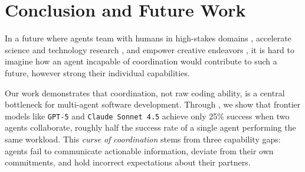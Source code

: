 



\section{Conclusion and Future Work}

In a future where agents team with humans in high-stakes domains \citep{kim2025srt}, accelerate science and technology research \citep{gottweis2025towards}, and empower creative endeavors \citep{waikar_2021}, it is hard to imagine how an agent incapable of coordination would contribute to such a future, however strong their individual capabilities.

Our work demonstrates that coordination, not raw coding ability, is a central bottleneck for multi-agent software development. Through \dataset, we show that frontier models like \texttt{GPT-5} and \texttt{Claude Sonnet 4.5} achieve only 25\% success when two agents collaborate, roughly half the success rate of a single agent performing the same workload. This \emph{curse of coordination} stems from three capability gaps: agents fail to communicate actionable information, deviate from their own commitments, and hold incorrect expectations about their partners.

